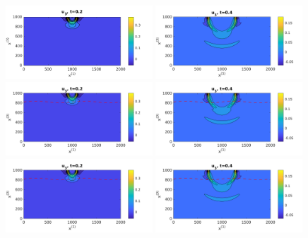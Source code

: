 \begin{figure}[htbp]
	\centering
	\includegraphics[width=0.49\textwidth,trim={0.05cm 0.1cm 0.55cm 0.45cm}, clip]{u3_t02_cartesian.png}
	\includegraphics[width=0.49\textwidth,trim={0.05cm 0.1cm 0.55cm 0.45cm}, clip]{u3_t04_cartesian.png}\\
	\includegraphics[width=0.49\textwidth,trim={0.05cm 0.1cm 0.55cm 0.45cm}, clip]{u3_t02_curvi_mr.png}
	\includegraphics[width=0.49\textwidth,trim={0.05cm 0.1cm 0.55cm 0.45cm}, clip]{u3_t04_curvi_mr.png}\\
	\includegraphics[width=0.49\textwidth,trim={0.05cm 0.1cm 0.55cm 0.45cm}, clip]{u3_t02_curvi_finer.png}
	\includegraphics[width=0.49\textwidth,trim={0.05cm 0.1cm 0.55cm 0.45cm}, clip]{u3_t04_curvi_finer.png}

\end{figure}
